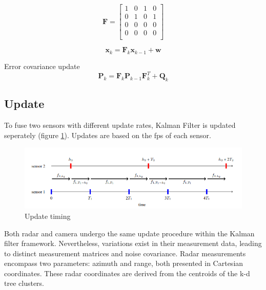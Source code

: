 \begin{equation}\label{equ:transition_matrix_H}
    \mathbf{F} = 
    \begin{bmatrix}
        1 & 0 & 1 & 0 \\
        0 & 1 & 0 & 1 \\
        0 & 0 & 0 & 0 \\
        0 & 0 & 0 & 0 \\
      \end{bmatrix}
\end{equation}

\begin{equation}\label{equ:predict_eq}
    \mathbf{x}_k=\mathbf{F}_k\mathbf{x}_{k-1}+\mathbf{w}
\end{equation}

Error covariance update
\begin{equation}\label{equ:error_covariance}
    \mathbf{P}_k=\mathbf{F}_k \mathbf{P}_{k-1} \mathbf{F}_k^T+\mathbf{Q}_k
\end{equation}

\newpage
\subsection{Update}\label{equ:2_update}
To fuse two sensors with different update rates, Kalman Filter is updated seperately (figure \ref{fig:sync_fig}).
Updates are based on the fps of each sensor.
\begin{figure}[hpbt]
    \centering
    \includegraphics[width=\textwidth]{Figures/sync.png}%
    \caption{Update timing \cite{7472511}}
    \label{fig:sync_fig}
\end{figure}


Both radar and camera undergo the same update procedure within the Kalman filter framework. 
Nevertheless, variations exist in their measurement data, 
leading to distinct measurement matrices and noise covariance. 
Radar measurements encompass two parameters: azimuth and range, 
both presented in Cartesian coordinates. 
These radar coordinates are derived from the centroids of the k-d tree clusters.

